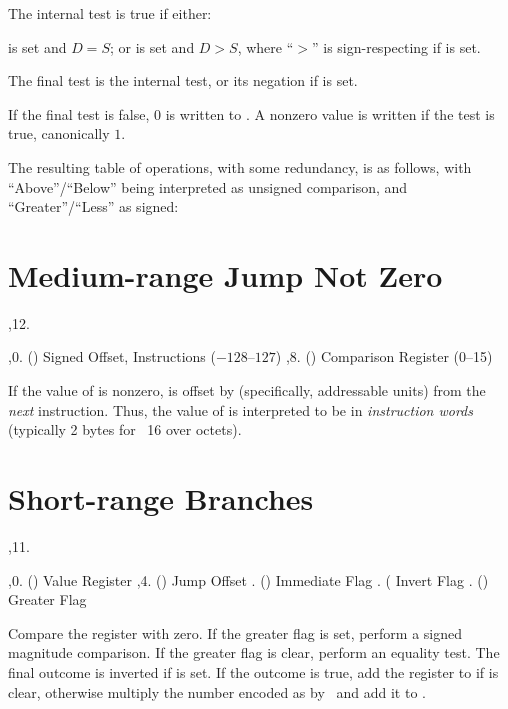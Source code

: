 The internal test is true if either:

\li {} is set and $D = S$; or
\li {} is set and $D > S$, where ``$>$'' is sign-respecting if 
is set.

The final test is the internal test, or its negation if  is set.

If the final test is false, $0$ is written to . A nonzero value is
written if the test is true, canonically $1$.

The resulting table of operations, with some redundancy, is as follows, with
``Above''/``Below'' being interpreted as unsigned comparison, and
``Greater''/``Less'' as signed:

\bigskip
{
	\tabskip=3pt
}
\bigskip

\section{Medium-range Jump Not Zero}

\noindent\ins{},12. 

\li \ins{},0. () Signed Offset, Instructions ($-128$--$127$)
\li \ins{},8. () Comparison Register (0--15)

If the value of  is nonzero,  is offset by 
(specifically,  addressable units) from the {\it next}
instruction. Thus, the value of  is interpreted to be in {\it
instruction words} (typically 2 bytes for \ass\ 16 over octets).

\section{Short-range Branches}

\noindent\ins{},11. 

\li \ins{},0. () Value Register
\li \ins{},4. () Jump Offset
\li \ins{}. () Immediate Flag
\li \ins{}. ( Invert Flag
\li \ins{}. () Greater Flag

Compare the  register with zero. If the greater flag is set, perform a
signed magnitude comparison. If the greater flag is clear, perform an equality
test. The final outcome is inverted if  is set. If the outcome is true,
add the  register to  if  is clear, otherwise multiply
the number encoded as  by \ist\ and add it to .

